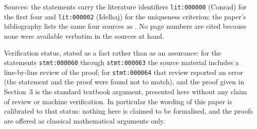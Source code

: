 \documentclass[11pt]{article}
\theoremstyle{definition}
\theoremstyle{remark}
\begin{document}
Sources: the statements carry the literature identifiers \texttt{lit:000000} (Conrad) for the first four and \texttt{lit:000002} (Idelhaj) for the uniqueness criterion; the paper's bibliography lists the same four sources as \cite{conrad,harris,idelhaj,vakil}. No page numbers are cited because none were available verbatim in the sources at hand.

Verification status, stated as a fact rather than as an assurance: for the statements \texttt{stmt:000060} through \texttt{stmt:000063} the source material includes a line-by-line review of the proof; for \texttt{stmt:000064} that review reported an error (the statement and the proof were found not to match), and the proof given in Section~3 is the standard textbook argument, presented here without any claim of review or machine verification. In particular the wording of this paper is calibrated to that status: nothing here is claimed to be formalised, and the proofs are offered as classical mathematical arguments only.


\end{document}
